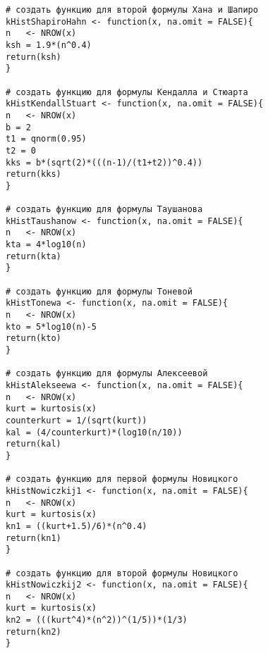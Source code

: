 \documentclass[]{scrartcl}
\begin{document}
\begin{lstlisting}
# создать функцию для второй формулы Хана и Шапиро
kHistShapiroHahn <- function(x, na.omit = FALSE){ 
n   <- NROW(x)                                  
ksh = 1.9*(n^0.4)                              
return(ksh)                                     
}                                                

# создать функцию для формулы Кендалла и Стюарта
kHistKendallStuart <- function(x, na.omit = FALSE){ 
n   <- NROW(x)                                   
b = 2                                            
t1 = qnorm(0.95)                                
t2 = 0                                           
kks = b*(sqrt(2)*(((n-1)/(t1+t2))^0.4))          
return(kks)                                    
}                                                  

# создать функцию для формулы Таушанова
kHistTaushanow <- function(x, na.omit = FALSE){ 
n   <- NROW(x)                                
kta = 4*log10(n)                             
return(kta)                                     
}                                              

# создать функцию для формулы Тоневой
kHistTonewa <- function(x, na.omit = FALSE){ 
n   <- NROW(x)                            
kto = 5*log10(n)-5                         
return(kto)                               
}                                           

# создать функцию для формулы Алексеевой
kHistAlekseewa <- function(x, na.omit = FALSE){
n   <- NROW(x)                               
kurt = kurtosis(x)                          
counterkurt = 1/(sqrt(kurt))                 
kal = (4/counterkurt)*(log10(n/10))         
return(kal)                                 
}                                             

# создать функцию для первой формулы Новицкого
kHistNowiczkij1 <- function(x, na.omit = FALSE){ 
n   <- NROW(x)                                
kurt = kurtosis(x)                             
kn1 = ((kurt+1.5)/6)*(n^0.4)                  
return(kn1)                                   
}                                               

# создать функцию для второй формулы Новицкого
kHistNowiczkij2 <- function(x, na.omit = FALSE){ 
n   <- NROW(x)                                
kurt = kurtosis(x)                             
kn2 = (((kurt^4)*(n^2))^(1/5))*(1/3)           
return(kn2)                                    
}                                               


\end{lstlisting}
\end{document}
